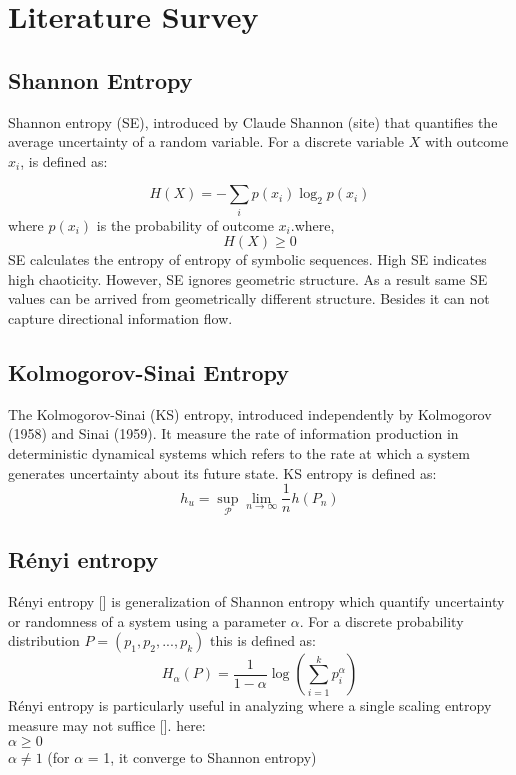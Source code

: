 \documentclass[%
 reprint,
 amsmath,amssymb,
 aps,
 floatfix,
]{revtex4-2}
\begin{document}
\section{Literature Survey}
\subsection{Shannon Entropy}
Shannon entropy (SE), introduced by Claude Shannon (site) that quantifies the average uncertainty of a random variable. For a discrete variable $X$ with outcome ${x_i}$, is defined as:

\begin{equation}
H(X) = -\sum_{i} p(x_i) \log_2 p(x_i)
\label{eq:shannon}
\end{equation}
where $p(x_i)$ is the probability of outcome $x_i$.where,
\[
H(X) \geq 0
\]
SE calculates the entropy of entropy of symbolic sequences. High SE indicates high chaoticity. However, SE ignores geometric structure. As a result same SE values can be arrived from geometrically different  structure. Besides it can not capture directional information flow.\\
\subsection{Kolmogorov-Sinai Entropy}
The Kolmogorov-Sinai (KS) entropy, introduced independently by Kolmogorov (1958) and Sinai (1959). It measure the rate of information production in deterministic dynamical systems which refers to the rate at which a system generates uncertainty about its future state. KS entropy is defined as:
\begin{equation}
	h_u  = \operatorname*{sup}_{\mathcal{P}} \operatorname*{\lim}_{n \to \infty} \frac{1}{n} h(P_n)	
\end{equation}
\subsection{Rényi entropy}
Rényi entropy [] is generalization of Shannon entropy which quantify uncertainty or randomness of a system using a parameter $\alpha$. For a discrete probability distribution $P = (p_1,p_2,...,p_k)$ this is defined as:
\begin{equation}
	H_\alpha (P) = \frac{1}{1 - \alpha} \log (\sum_{i=1}^{k} p_{i}^{\alpha})
\end{equation}
R\'enyi entropy is particularly useful in analyzing where a single scaling entropy measure may not suffice []. 
here:\\
$\alpha \geq 0$\\ 
$\alpha \neq 1$ (for $\alpha$ = 1, it converge to Shannon entropy)\\
\end{document}
